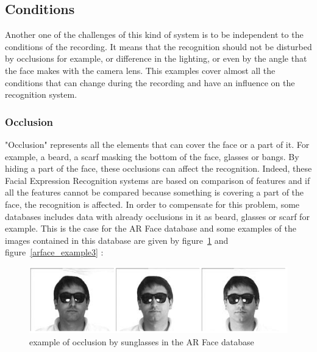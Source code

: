\subsection{Conditions}

\vspace{\baselineskip}
\noindent Another one of the challenges of this kind of system is to be independent to the conditions of the recording. It means that the recognition should not be disturbed by occlusions for example, or difference in the lighting, or even by the angle that the face makes with the camera lens. This examples cover almost all the conditions that can change during the recording and have an influence on the recognition system. 
\newline

\subsubsection{Occlusion}

\vspace{\baselineskip}
\noindent "Occlusion" represents all the elements that can cover the face or a part of it. For example, a beard, a scarf masking the bottom of the face, glasses or bangs. By hiding a part of the face, these occlusions can affect the recognition. Indeed, these Facial Expression Recognition systems are based on comparison of features and if all the features cannot be compared because something is covering a part of the face, the recognition is affected. In order to compensate for this problem, some databases includes data with already occlusions in it as beard, glasses or scarf for example. This is the case for the AR Face database and some examples of the images contained in this database are given by figure~\ref{arface_example2} and figure~\ref{arface_example3} \cite{ARFACE}:
\newline

\begin{figure}[!h]
\begin{center}
\noindent \includegraphics[scale=0.7]{figures/arface_example2} 
\newline
\caption{example of occlusion by sunglasses in the AR Face database}
\label{arface_example2}
\end{center} 
\end{figure}


